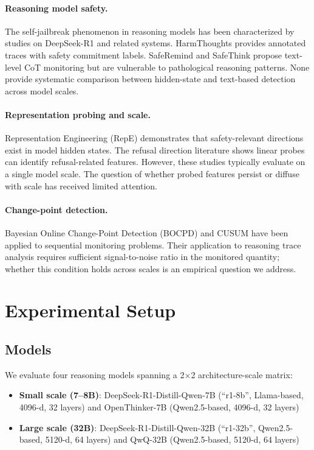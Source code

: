 \documentclass[11pt]{article}
\begin{document}
\paragraph{Reasoning model safety.} The self-jailbreak phenomenon in reasoning models has been characterized by studies on DeepSeek-R1 and related systems. HarmThoughts provides annotated traces with safety commitment labels. SafeRemind and SafeThink propose text-level CoT monitoring but are vulnerable to pathological reasoning patterns. None provide systematic comparison between hidden-state and text-based detection across model scales.

\paragraph{Representation probing and scale.} Representation Engineering (RepE) demonstrates that safety-relevant directions exist in model hidden states. The refusal direction literature shows linear probes can identify refusal-related features. However, these studies typically evaluate on a single model scale. The question of whether probed features persist or diffuse with scale has received limited attention.

\paragraph{Change-point detection.} Bayesian Online Change-Point Detection (BOCPD) and CUSUM have been applied to sequential monitoring problems. Their application to reasoning trace analysis requires sufficient signal-to-noise ratio in the monitored quantity; whether this condition holds across scales is an empirical question we address.

\section{Experimental Setup}

\subsection{Models}

We evaluate four reasoning models spanning a 2$\times$2 architecture-scale matrix:
\begin{itemize}
\item \textbf{Small scale (7--8B)}: DeepSeek-R1-Distill-Qwen-7B (``r1-8b'', Llama-based, 4096-d, 32 layers) and OpenThinker-7B (Qwen2.5-based, 4096-d, 32 layers)
\item \textbf{Large scale (32B)}: DeepSeek-R1-Distill-Qwen-32B (``r1-32b'', Qwen2.5-based, 5120-d, 64 layers) and QwQ-32B (Qwen2.5-based, 5120-d, 64 layers)
\end{itemize}
\end{document}

